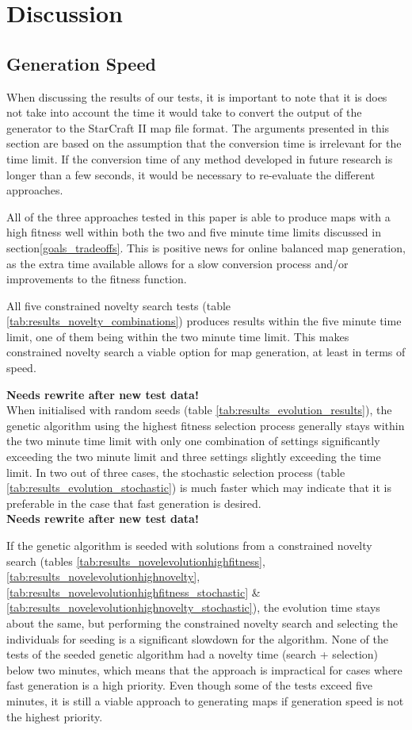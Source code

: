 \chapter{Discussion}
\label{discussion_quality}

\section{Generation Speed}
\label{discussion_speed}
When discussing the results of our tests, it is important to note that it is does not take into account the time it would take to convert the output of the generator to the StarCraft II map file format. The arguments presented in this section are based on the assumption that the conversion time is irrelevant for the time limit. If the conversion time of any method developed in future research is longer than a few seconds, it would be necessary to re-evaluate the different approaches.

All of the three approaches tested in this paper is able to produce maps with a high fitness well within both the two and five minute time limits discussed in section\ref{goals_tradeoffs}. This is positive news for online balanced map generation, as the extra time available allows for a slow conversion process and/or improvements to the fitness function.

All five constrained novelty search tests (table \ref{tab:results_novelty_combinations}) produces results within the five minute time limit, one of them being within the two minute time limit. This makes constrained novelty search a viable option for map generation, at least in terms of speed.

\textbf{Needs rewrite after new test data!}
\\When initialised with random seeds (table \ref{tab:results_evolution_results}), the genetic algorithm using the highest fitness selection process generally stays within the two minute time limit with only one combination of settings significantly exceeding the two minute limit and three settings slightly exceeding the time limit. In two out of three cases, the stochastic selection process (table \ref{tab:results_evolution_stochastic}) is much faster which may indicate that it is preferable in the case that fast generation is desired. 
\\\textbf{Needs rewrite after new test data!}

If the genetic algorithm is seeded with solutions from a constrained novelty search (tables \ref{tab:results_novelevolutionhighfitness}, \ref{tab:results_novelevolutionhighnovelty}, \ref{tab:results_novelevolutionhighfitness_stochastic} \& \ref{tab:results_novelevolutionhighnovelty_stochastic}), the evolution time stays about the same, but performing the constrained novelty search and selecting the individuals for seeding is a significant slowdown for the algorithm. None of the tests of the seeded genetic algorithm had a novelty time (search + selection) below two minutes, which means that the approach is impractical for cases where fast generation is a high priority. Even though some of the tests exceed five minutes, it is still a viable approach to generating maps if generation speed is not the highest priority.

